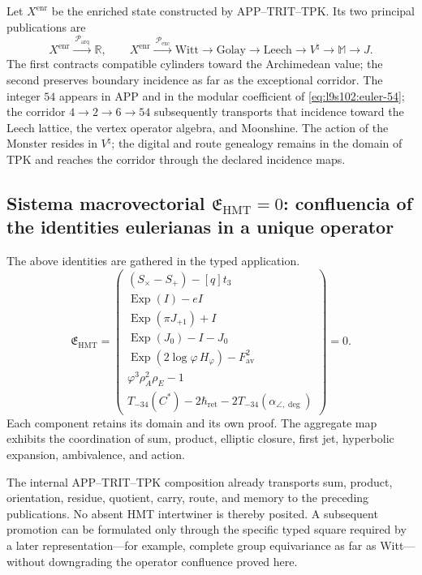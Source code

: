 Let \(X^{\mathrm{enr}}\) be the enriched state constructed by
APP--TRIT--TPK. Its two principal publications are
\begin{equation}
 X^{\mathrm{enr}}
 \xrightarrow{\ \mathcal P_{\mathrm{arq}}\ }\mathbb R,
 \qquad
 X^{\mathrm{enr}}
 \xrightarrow{\ \mathcal P_{\mathrm{exc}}\ }
 \mathrm{Witt}\to\mathrm{Golay}\to\mathrm{Leech}
 \to V^\natural\to\mathbb M\to J.
 \label{eq:l9s102:euler-doble-proyeccion}
\end{equation}
The first contracts compatible cylinders toward the Archimedean value; the
second preserves boundary incidence as far as the exceptional corridor.
The integer \(54\) appears in APP and in the modular coefficient of
\cref{eq:l9s102:euler-54}; the corridor \(4\to2\to6\to54\) subsequently transports
that incidence toward the Leech lattice, the vertex operator algebra,
and Moonshine. The action of the Monster resides in
\(V^\natural\); the digital and route genealogy remains in the domain
of TPK and reaches the corridor through the declared incidence maps.

\subsection{Sistema macrovectorial \texorpdfstring{\(\mathfrak E_{\mathrm{HMT}}=0\)}{E_HMT=0}: confluencia of the identities eulerianas in a unique operator}
\label{sec:l9s102:euler-macrovector}

The above identities are gathered in the typed application.
\begin{equation}
 \boxed{
 \mathfrak E_{\mathrm{HMT}}=
 \begin{pmatrix}
 (S_\times-S_+)-[q]t_3\\[1mm]
 \operatorname{Exp}(I)-eI\\
 \operatorname{Exp}(\pi J_{+1})+I\\
 \operatorname{Exp}(J_0)-I-J_0\\
 \operatorname{Exp}(2\log\varphi\,H_\varphi)-F_{\mathrm{av}}^2\\
 \varphi^3\rho_A^2\rho_E-1\\
 T_{-34}(C^*)-2\hbar_{\mathrm{ret}}
 -2T_{-34}(\alpha_{\angle,\deg})
 \end{pmatrix}=0.}
 \label{eq:l9s102:euler-macrovector}
\end{equation}
Each component retains its domain and its own proof. The aggregate
map exhibits the coordination of sum, product, elliptic closure, first
jet, hyperbolic expansion, ambivalence, and action.

The internal APP--TRIT--TPK composition already transports sum, product,
orientation, residue, quotient, carry, route, and memory to the
preceding publications. No absent HMT intertwiner is thereby posited. A
subsequent promotion can be formulated only through the specific typed square
required by a later representation---for example, complete group
equivariance as far as Witt---without downgrading the operator confluence
proved here.
